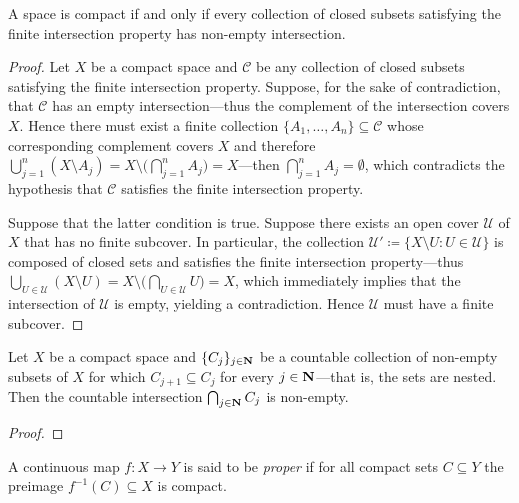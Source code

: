 \begin{proposition}
\label{prop:compact-iff-FIP}
A space is compact if and only if every collection of closed subsets satisfying
the finite intersection property has non-empty intersection.
\end{proposition}

\begin{proof}
Let \(X\) be a compact space and \(\mathcal{C}\) be any collection of closed
subsets satisfying the finite intersection property. Suppose, for the sake of
contradiction, that \(\mathcal{C}\) has an empty intersection---thus the
complement of the intersection covers \(X\). Hence there must exist a finite
collection \(\{A_1, \dots, A_n\} \subseteq \mathcal{C}\) whose corresponding
complement covers \(X\) and therefore
\(\bigcup_{j=1}^n (X \setminus A_j) = X \setminus \big( \bigcap_{j=1}^n A_j \big)
= X\)---then \(\bigcap_{j=1}^n A_j = \emptyset\), which contradicts the
hypothesis that \(\mathcal{C}\) satisfies the finite intersection property.

Suppose that the latter condition is true. Suppose there exists an open cover
\(\mathcal{U}\) of \(X\) that has no finite subcover. In particular, the
collection \(\mathcal{U}' \coloneq \{X \setminus U : U \in \mathcal{U}\}\) is
composed of closed sets and satisfies the finite intersection property---thus
\(\bigcup_{U \in \mathcal{U}} (X \setminus U) = X \setminus \big( \bigcap_{U \in
  \mathcal{U}} U \big) = X\), which immediately implies that the intersection of
\(\mathcal{U}\) is empty, yielding a contradiction. Hence \(\mathcal{U}\) must
have a finite subcover.
\end{proof}

\begin{lemma}
\label{lem:cpct-countable-intersection-nested-non-empty}
Let \(X\) be a compact space and \(\{C_j\}_{j \in \mathbf{N}}\) be a countable
collection of non-empty subsets of \(X\) for which \(C_{j+1} \subseteq C_j\) for
every \(j \in \mathbf{N}\)---that is, the sets are nested. Then the countable
intersection \(\bigcap_{j \in \mathbf{N}} C_j\) is non-empty.
\end{lemma}

\begin{proof}
\end{proof}

\begin{definition}
\label{def:proper-Top}
A continuous map \(f: X \to Y\) is said to be \emph{proper} if for all compact
sets \(C \subseteq Y\) the preimage \(f^{-1}(C) \subseteq X\) is compact.
\end{definition}

